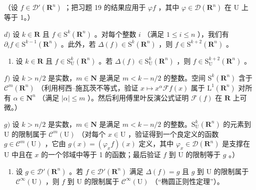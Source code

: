 （设 \(f \in \mathcal{D}'(\mathbf{R}^n)\) ；把习题 19 的结果应用于 \(\varphi f\) ，其中 \(\varphi \in \mathcal{D}(\mathbf{R}^n)\) 在 U 上等于 1。）

\(d)\) 设 \(k \in \mathbf{R}\) 且 \(f \in \mathrm{S}^k(\mathbf{R}^n)\) 。对每个整数 \(i\) （满足 \(1 \leqslant i \leqslant n\) ），我们有 \(\partial_i f \in \mathrm{S}^{k-1}(\mathbf{R}^n)\) 。此外，若 \(\Delta(f) \in \mathrm{S}^k(\mathbf{R}^n)\) ，则 \(f \in \mathrm{S}^{k+2}(\mathbf{R}^n)\) 。

\begin{enumerate}
\def\labelenumi{\alph{enumi})}
\setcounter{enumi}{4}
\tightlist
\item
  设 \(k \in \mathbf{R}\) 且 \(f \in \mathrm{S}_{\mathrm{U}}^{k}(\mathbf{R}^{n})\) 。若 \(\Delta(f) \in \mathrm{S}_{\mathrm{U}}^{k}(\mathbf{R}^{n})\) ，则 \(f \in \mathrm{S}_{\mathrm{U}}^{k+2}(\mathbf{R}^{n})\) 。
\end{enumerate}

\(f)\) 设 \(k > n/2\) 是实数，\(m \in \mathbf{N}\) 是满足 \(m < k - n/2\) 的整数。空间 \(\mathrm{S}^k(\mathbf{R}^n)\) 含于 \(\mathcal{C}^m(\mathbf{R}^n)\) （利用柯西–施瓦茨不等式，验证 \(x \mapsto x^\alpha \mathscr{F} f(x)\) 属于 \(\mathrm{L}^1(\mathbf{R}^n)\) 对所有 \(\alpha \in \mathbf{N}^n\) （满足 \(|\alpha| \leqslant m\) ）。然后利用傅里叶反演公式证明 \(\mathscr{F}(f)\) 在 \(\mathbf{R}\) 上可微。）

\(g)\) 设 \(k > n/2\) 是实数，\(m \in \mathbf{N}\) 是满足 \(m < k - n/2\) 的整数。\(\mathrm{S}_{\mathrm{U}}^{k}(\mathbf{R}^{n})\) 的元素到 U 的限制属于 \(\mathcal{C}^{m}(\mathrm{U})\) （对每个 \(x \in \mathrm{U}\) ，验证得到一个良定义的函数 \(g \in \mathcal{C}^{m}(\mathrm{U})\) ，它由 \(g(x) = (\varphi_{x}f)(x)\) 定义，其中 \(\varphi_{x} \in \mathcal{D}(\mathbf{R}^{n})\) 是支撑在 U 中且在 \(x\) 的一个邻域中等于 1 的函数；最后验证 \(f\) 到 U 的限制等于 \(g\) 。）

\begin{enumerate}
\def\labelenumi{\alph{enumi})}
\setcounter{enumi}{7}
\tightlist
\item
  设 \(g \in \mathcal{D}'(\mathbf{R}^n)\) 。若 \(f \in \mathcal{D}'(\mathbf{R}^n)\) 满足 \(\Delta(f) = g\) 且 \(g\) 到 U 的限制属于 \(\mathcal{C}^\infty(\mathrm{U})\) ，则 \(f\) 到 U 的限制属于 \(\mathcal{C}^\infty(\mathrm{U})\) （“椭圆正则性定理”）。
\end{enumerate}


